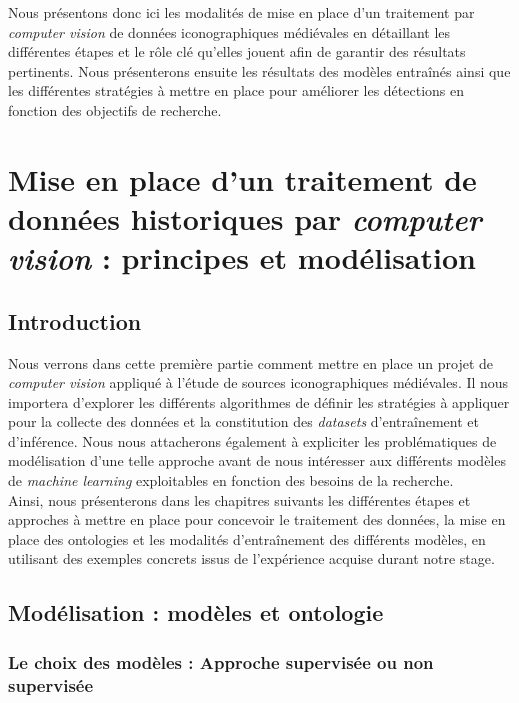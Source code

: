 \documentclass[12pt,twoside]{book}
\begin{document}
\newpage
 Nous présentons donc ici les modalités de mise en place d’un traitement par \textit{computer vision} de données iconographiques médiévales en détaillant les différentes étapes et le rôle clé qu’elles jouent afin de garantir des résultats pertinents. Nous présenterons ensuite les résultats des modèles entraînés ainsi que les différentes stratégies à mettre en place pour améliorer les détections en fonction des objectifs de recherche. 

\mainmatter


\part{Mise en place d'un traitement de données historiques par \textit{computer vision} : principes et modélisation}

\chapter{Introduction}
Nous verrons dans cette première partie comment mettre en place un projet de \textit{computer vision} appliqué à l’étude de sources iconographiques médiévales. Il nous importera d'explorer les différents algorithmes de définir les stratégies à appliquer pour la collecte des données et la constitution des \textit{datasets} d’entraînement et d’inférence. Nous nous attacherons également à expliciter les problématiques de modélisation d’une telle approche avant de nous intéresser aux différents modèles de \textit{machine learning} exploitables en fonction des besoins de la recherche.\\

Ainsi, nous présenterons dans les chapitres suivants les différentes étapes et approches à mettre en place pour concevoir le traitement des données, la mise en place des ontologies et les modalités d’entraînement des différents modèles, en utilisant des exemples concrets issus de l’expérience acquise durant notre stage.

\chapter{Modélisation : modèles et ontologie}

\section[Le choix des modèles ]{Le choix des modèles : Approche supervisée ou non supervisée }
\end{document}
